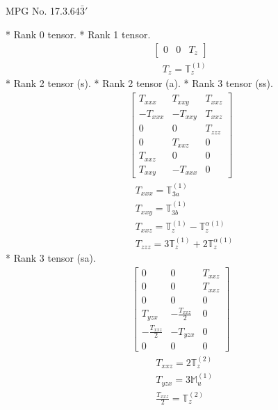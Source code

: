 \documentclass[fleqn,8pt,landscape]{jsarticle}
\begin{document}
\setcounter{MaxMatrixCols}{32}

\renewcommand{\tablename}{Table~}
\renewcommand{\figurename}{Figure~}
\begin{center}
\LARGE
MPG No. 17.3.64\quad$\bar{3}'$
\end{center}
* Rank 0 tensor.
* Rank 1 tensor.
\begin{align*}
\begin{bmatrix} 0 & 0 & T_{z} \end{bmatrix}
\end{align*}
\begin{align*}
& T_{z} = \mathbb{T}_{z}^{(1)}
\end{align*}
* Rank 2 tensor (s).
* Rank 2 tensor (a).
* Rank 3 tensor (ss).
\begin{align*}
\begin{bmatrix} T_{xxx} & T_{xxy} & T_{xxz} \\ - T_{xxx} & - T_{xxy} & T_{xxz} \\ 0 & 0 & T_{zzz} \\ 0 & T_{xxz} & 0 \\ T_{xxz} & 0 & 0 \\ T_{xxy} & - T_{xxx} & 0 \end{bmatrix}
\end{align*}
\begin{align*}
& T_{xxx} = \mathbb{T}_{3a}^{(1)} \\
& T_{xxy} = \mathbb{T}_{3b}^{(1)} \\
& T_{xxz} = \mathbb{T}_{z}^{(1)} - \mathbb{T}_{z}^{\alpha(1)} \\
& T_{zzz} = 3 \mathbb{T}_{z}^{(1)} + 2 \mathbb{T}_{z}^{\alpha(1)}
\end{align*}
* Rank 3 tensor (sa).
\begin{align*}
\begin{bmatrix} 0 & 0 & T_{xxz} \\ 0 & 0 & T_{xxz} \\ 0 & 0 & 0 \\ T_{yzx} & - \frac{T_{xxz}}{2} & 0 \\ - \frac{T_{xxz}}{2} & - T_{yzx} & 0 \\ 0 & 0 & 0 \end{bmatrix}
\end{align*}
\begin{align*}
& T_{xxz} = 2 \mathbb{T}_{z}^{(2)} \\
& T_{yzx} = 3 \mathbb{M}_{u}^{(1)} \\
& \frac{T_{xxz}}{2} = \mathbb{T}_{z}^{(2)}
\end{align*}
\end{document}
